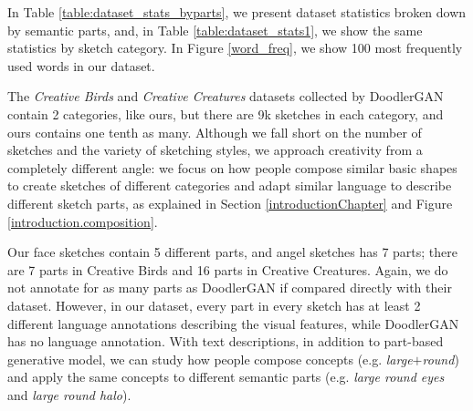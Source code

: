 In Table \ref{table:dataset_stats_byparts}, we present dataset statistics broken down by semantic parts, and, in Table \ref{table:dataset_stats1}, we show the same statistics by sketch category. In Figure \ref{word_freq}, we show 100 most frequently used words in our dataset. 

The \textit{Creative Birds} and \textit{Creative Creatures} datasets collected by DoodlerGAN \citep{doodlerGAN} contain 2 categories, like ours, but there are 9k sketches in each category, and ours contains one tenth as many. Although we fall short on the number of sketches and the variety of sketching styles, we approach creativity from a completely different angle: we focus on how people compose similar basic shapes to create sketches of different categories and adapt similar language to describe different sketch parts, as explained in Section \ref{introductionChapter} and Figure \ref{introduction.composition}.  

Our face sketches contain 5 different parts, and angel sketches has 7 parts; there are 7 parts in Creative Birds and 16 parts in Creative Creatures. Again, we do not annotate for as many parts as DoodlerGAN if compared directly with their dataset. However, in our dataset, every part in every sketch has at least 2 different language annotations describing the visual features, while DoodlerGAN has no language annotation. With text descriptions, in addition to part-based generative model, we can study how people compose concepts (e.g. \textit{large}$+$\textit{round}) and apply the same concepts to different semantic parts (e.g. \textit{large round eyes} and \textit{large round halo}).     




